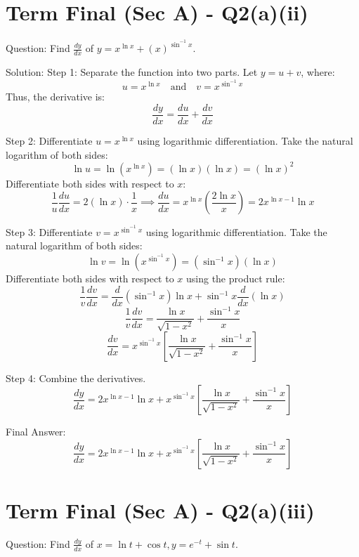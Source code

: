 \documentclass{article}
\begin{document}
\section*{Term Final (Sec A) - Q2(a)(ii)}
Question:
Find $\frac{dy}{dx}$ of $y = x^{\ln x} + (x)^{\sin^{-1} x}$.

Solution:
Step 1: Separate the function into two parts.
Let $y = u + v$, where:
\[
u = x^{\ln x} \quad \text{and} \quad v = x^{\sin^{-1} x}
\]
Thus, the derivative is:
\[
\frac{dy}{dx} = \frac{du}{dx} + \frac{dv}{dx}
\]

Step 2: Differentiate $u = x^{\ln x}$ using logarithmic differentiation.
Take the natural logarithm of both sides:
\[
\ln u = \ln\left(x^{\ln x}\right) = (\ln x)(\ln x) = (\ln x)^2
\]
Differentiate both sides with respect to $x$:
\[
\frac{1}{u} \frac{du}{dx} = 2(\ln x) \cdot \frac{1}{x} \implies \frac{du}{dx} = x^{\ln x} \left( \frac{2\ln x}{x} \right) = 2x^{\ln x - 1} \ln x
\]

Step 3: Differentiate $v = x^{\sin^{-1} x}$ using logarithmic differentiation.
Take the natural logarithm of both sides:
\[
\ln v = \ln\left(x^{\sin^{-1} x}\right) = (\sin^{-1} x)(\ln x)
\]
Differentiate both sides with respect to $x$ using the product rule:
\[
\frac{1}{v} \frac{dv}{dx} = \frac{d}{dx}(\sin^{-1} x) \ln x + \sin^{-1} x \frac{d}{dx}(\ln x)
\]
\[
\frac{1}{v} \frac{dv}{dx} = \frac{\ln x}{\sqrt{1-x^2}} + \frac{\sin^{-1} x}{x}
\]
\[
\frac{dv}{dx} = x^{\sin^{-1} x} \left[ \frac{\ln x}{\sqrt{1-x^2}} + \frac{\sin^{-1} x}{x} \right]
\]

Step 4: Combine the derivatives.
\[
\frac{dy}{dx} = 2x^{\ln x - 1} \ln x + x^{\sin^{-1} x} \left[ \frac{\ln x}{\sqrt{1-x^2}} + \frac{\sin^{-1} x}{x} \right]
\]

Final Answer:
\[
\boxed{\frac{dy}{dx} = 2x^{\ln x - 1} \ln x + x^{\sin^{-1} x} \left[ \frac{\ln x}{\sqrt{1-x^2}} + \frac{\sin^{-1} x}{x} \right]}
\]

\section*{Term Final (Sec A) - Q2(a)(iii)}
Question:
Find $\frac{dy}{dx}$ of $x = \ln t + \cos t, y = e^{-t} + \sin t$.
\end{document}
